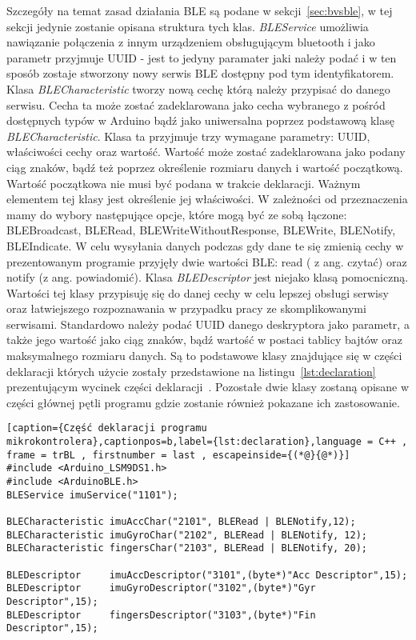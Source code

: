 Szczegóły na temat zasad działania BLE są podane w sekcji~\ref{sec:bvsble}, w tej sekcji jedynie zostanie opisana struktura tych klas. \textit{BLEService} umożliwia nawiązanie połączenia z innym urządzeniem obsługującym bluetooth i jako parametr przyjmuje UUID - jest to jedyny paramater jaki należy podać i w ten sposób zostaje stworzony nowy serwis BLE dostępny pod tym identyfikatorem. Klasa \textit{BLECharacteristic} tworzy nową cechę którą należy przypisać do danego serwisu. Cecha ta może zostać zadeklarowana jako cecha wybranego z pośród dostępnych typów w Arduino bądź jako uniwersalna poprzez podstawową klasę \textit{BLECharacteristic}. Klasa ta przyjmuje trzy wymagane parametry: UUID, właściwości cechy oraz wartość. Wartość może zostać zadeklarowana jako podany ciąg znaków, bądź też poprzez określenie rozmiaru danych i wartość początkową. Wartość początkowa nie musi być podana w trakcie deklaracji. Ważnym elementem tej klasy jest określenie jej właściwości. W zależności od przeznaczenia mamy do wybory następujące opcje, które mogą być ze sobą łączone: BLEBroadcast, BLERead, BLEWriteWithoutResponse, BLEWrite, BLENotify, BLEIndicate. W celu wysyłania danych podczas gdy dane te się zmienią cechy w prezentowanym programie przyjęły dwie wartości BLE: read ( z ang. czytać) oraz notify (z ang. powiadomić). Klasa \textit{BLEDescriptor} jest niejako klasą pomocniczną. Wartości tej klasy przypisuję się do danej cechy w celu lepszej obsługi serwisy oraz łatwiejszego rozpoznawania w przypadku pracy ze skomplikowanymi serwisami. Standardowo należy podać UUID danego deskryptora jako parametr, a także jego wartość jako ciąg znaków, bądź wartość w postaci tablicy bajtów oraz maksymalnego rozmiaru danych. Są to podstawowe klasy znajdujące się w części deklaracji których użycie zostały przedstawione na listingu~\ref{lst:declaration} prezentującym wycinek części deklaracji~\cite{ArduinoBLE}. Pozostałe dwie klasy zostaną opisane w części głównej pętli programu gdzie zostanie również pokazane ich zastosowanie. \newpage 

\begin{lstlisting}[caption={Część deklaracji programu mikrokontrolera},captionpos=b,label={lst:declaration},language = C++ , frame = trBL , firstnumber = last , escapeinside={(*@}{@*)}]
#include <Arduino_LSM9DS1.h>
#include <ArduinoBLE.h>
BLEService imuService("1101");

BLECharacteristic imuAccChar("2101", BLERead | BLENotify,12);
BLECharacteristic imuGyroChar("2102", BLERead | BLENotify, 12);
BLECharacteristic fingersChar("2103", BLERead | BLENotify, 20);

BLEDescriptor     imuAccDescriptor("3101",(byte*)"Acc Descriptor",15);
BLEDescriptor     imuGyroDescriptor("3102",(byte*)"Gyr Descriptor",15);
BLEDescriptor     fingersDescriptor("3103",(byte*)"Fin Descriptor",15);
\end{lstlisting}


